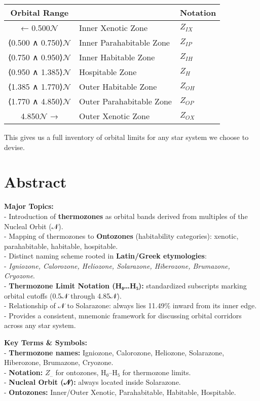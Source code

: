 \documentclass[
  letterpaper,
]{book}
\begin{document}
\begin{longtable}[]{@{}cll@{}}
\toprule\noalign{}
Orbital Range & & Notation \\
\midrule\noalign{}
\endhead
\bottomrule\noalign{}
\endlastfoot
← 0.500\(\mathcal{N}\) & Inner Xenotic Zone & \(Z_{IX}\) \\
⟨0.500 ∧ 0.750⟩\(\mathcal{N}\) & Inner Parahabitable Zone &
\(Z_{IP}\) \\
⟨0.750 ∧ 0.950⟩\(\mathcal{N}\) & Inner Habitable Zone & \(Z_{IH}\) \\
⟨0.950 ∧ 1.385⟩\(\mathcal{N}\) & Hospitable Zone & \(Z_{H}\) \\
⟨1.385 ∧ 1.770⟩\(\mathcal{N}\) & Outer Habitable Zone & \(Z_{OH}\) \\
⟨1.770 ∧ 4.850⟩\(\mathcal{N}\) & Outer Parahabitable Zone &
\(Z_{OP}\) \\
4.850\(\mathcal{N}\) → & Outer Xenotic Zone & \(Z_{OX}\) \\
\end{longtable}

This gives us a full inventory of orbital limits for any star system we
choose to devise.

\section{Abstract}\label{abstract-9}

\textbf{Major Topics:}\\
- Introduction of \textbf{thermozones} as orbital bands derived from
multiples of the Nucleal Orbit (𝒩).\\
- Mapping of thermozones to \textbf{Ontozones} (habitability
categories): xenotic, parahabitable, habitable, hospitable.\\
- Distinct naming scheme rooted in \textbf{Latin/Greek etymologies}:\\
- \emph{Igniozone, Calorozone, Heliozone, Solarazone, Hiberozone,
Brumazone, Cryozone}.\\
- \textbf{Thermozone Limit Notation (H₀\ldots H₅):} standardized
subscripts marking orbital cutoffs (0.5𝒩 through 4.85𝒩).\\
- Relationship of 𝒩 to Solarazone: always lies 11.49\% inward from its
inner edge.\\
- Provides a consistent, mnemonic framework for discussing orbital
corridors across any star system.

\textbf{Key Terms \& Symbols:}\\
- \textbf{Thermozone names:} Igniozone, Calorozone, Heliozone,
Solarazone, Hiberozone, Brumazone, Cryozone.\\
- \textbf{Notation:} \(Z_{..}\) for ontozones, H₀--H₅ for thermozone
limits.\\
- \textbf{Nucleal Orbit (𝒩):} always located inside Solarazone.\\
- \textbf{Ontozones:} Inner/Outer Xenotic, Parahabitable, Habitable,
Hospitable.
\end{document}
